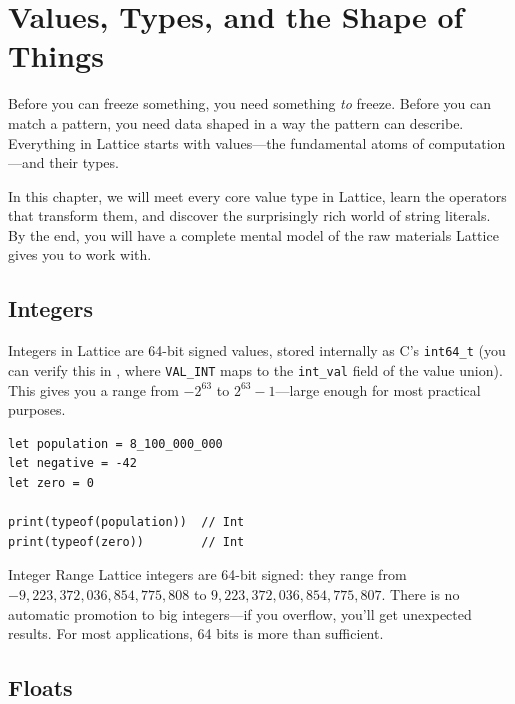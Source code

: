 \chapter{Values, Types, and the Shape of Things}\label{ch:values-types}


Before you can freeze something, you need something \emph{to} freeze.
Before you can match a pattern, you need data shaped in a way the pattern can describe.
Everything in Lattice starts with values---the fundamental atoms of computation---and their types.

In this chapter, we will meet every core value type in Lattice, learn the operators that transform them, and discover the surprisingly rich world of string literals.
By the end, you will have a complete mental model of the raw materials Lattice gives you to work with.

\section{Integers}\label{sec:integers}

Integers in Lattice are 64-bit signed values, stored internally as C's \lstinline|int64_t| (you can verify this in , where \lstinline|VAL_INT| maps to the \lstinline|int_val| field of the value union).
This gives you a range from $-2^{63}$ to $2^{63}-1$---large enough for most practical purposes.

\begin{lstlisting}[language=Lattice, caption={Integer basics}]
let population = 8_100_000_000
let negative = -42
let zero = 0

print(typeof(population))  // Int
print(typeof(zero))        // Int
\end{lstlisting}

\begin{defnbox}{Integer Range}
Lattice integers are 64-bit signed: they range from $-9{,}223{,}372{,}036{,}854{,}775{,}808$ to $9{,}223{,}372{,}036{,}854{,}775{,}807$.
There is no automatic promotion to big integers---if you overflow, you'll get unexpected results.
For most applications, 64 bits is more than sufficient.
\end{defnbox}

\section{Floats}\label{sec:floats}

